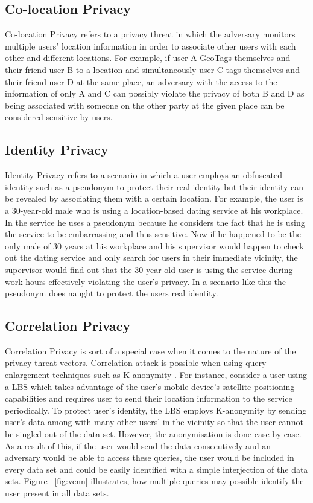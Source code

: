 \documentclass[english]{tktltiki2}
\theoremstyle{definition}
\theoremstyle{remark}
\begin{document}
\subsection{Co-location Privacy}
Co-location Privacy refers to a privacy threat in which the adversary monitors multiple users' location information in order to associate other users with each other and different locations. For example, if user A GeoTags themselves and their friend user B to a location and simultaneously user C tags themselves and their friend user D at the same place, an adversary with the access to the information of only A and C can possibly violate the privacy of both B and D as being associated with someone on the other party at the given place can be considered sensitive by users.

\subsection{Identity Privacy}
Identity Privacy refers to a scenario in which a user employs an obfuscated identity such as a pseudonym to protect their real identity but their identity can be revealed by associating them with a certain location. For example, the user is a 30-year-old male who is using a location-based dating service at his workplace. In the service he uses a pseudonym because he considers the fact that he is using the service to be embarrassing and thus sensitive. Now if he happened to be the only male of 30 years at his workplace and his supervisor would happen to check out the dating service and only search for users in their immediate vicinity, the supervisor would find out that the 30-year-old user is using the service during work hours effectively violating the user's privacy. In a scenario like this the pseudonym does naught to protect the users real identity.

\subsection{Correlation Privacy}
Correlation Privacy is sort of a special case when it comes to the nature of the privacy threat vectors. Correlation attack is possible when using query enlargement techniques such as K-anonymity \cite{Sweeney:2002:KAM:774544.774552}. For instance, consider a user using a LBS which takes advantage of the user's mobile device's satellite positioning capabilities and requires user to send their location information to the service periodically. To protect user's identity, the LBS employs K-anonymity by sending user's data among with many other users' in the vicinity so that the user cannot be singled out of the data set. However, the anonymisation is done case-by-case. As a result of this, if the user would send the data consecutively and an adversary would be able to access these queries, the user would be included in every data set and could be easily identified with a simple interjection of the data sets. Figure ~\ref{fig:venn} illustrates, how multiple queries may possible identify the user present in all data sets.
\end{document}
